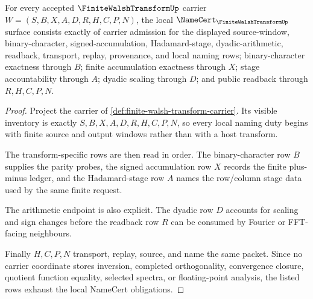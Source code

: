 \begin{theorem}
\label{thm:finite-walsh-transform-namecert-obligations}
For every accepted $\FiniteWalshTransformUp$ carrier $W=(S,B,X,A,D,R,H,C,P,N)$, the local $\NameCert_{\FiniteWalshTransformUp}$ surface consists exactly of carrier admission for the displayed source-window, binary-character, signed-accumulation, Hadamard-stage, dyadic-arithmetic, readback, transport, replay, provenance, and local naming rows; binary-character exactness through $B$; finite accumulation exactness through $X$; stage accountability through $A$; dyadic scaling through $D$; and public readback through $R,H,C,P,N$.
\end{theorem}
\begin{proof}
Project the carrier of \autoref{def:finite-walsh-transform-carrier}. Its visible inventory is exactly $S,B,X,A,D,R,H,C,P,N$, so every local naming duty begins with finite source and output windows rather than with a host transform.

The transform-specific rows are then read in order. The binary-character row $B$ supplies the parity probes, the signed accumulation row $X$ records the finite plus-minus ledger, and the Hadamard-stage row $A$ names the row/column stage data used by the same finite request.

The arithmetic endpoint is also explicit. The dyadic row $D$ accounts for scaling and sign changes before the readback row $R$ can be consumed by Fourier or FFT-facing neighbours.

Finally $H,C,P,N$ transport, replay, source, and name the same packet. Since no carrier coordinate stores inversion, completed orthogonality, convergence closure, quotient function equality, selected spectra, or floating-point analysis, the listed rows exhaust the local NameCert obligations.
\end{proof}

